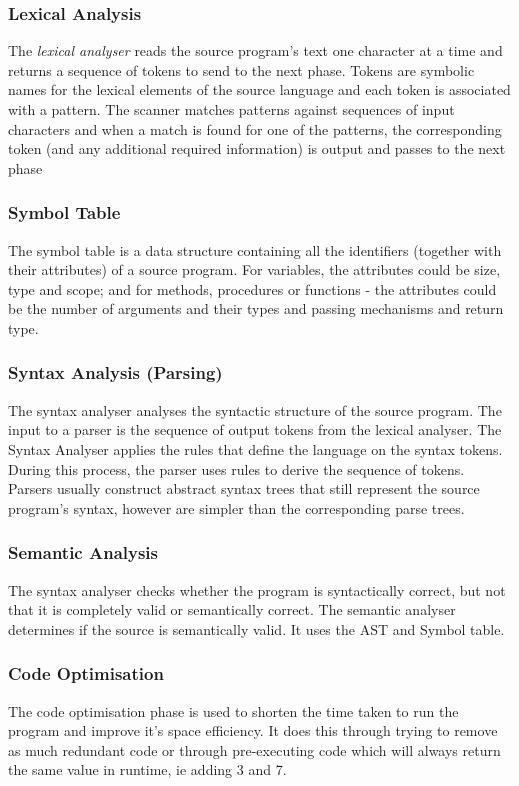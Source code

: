\subsubsection{Lexical Analysis}
The \textit{lexical analyser} reads the source program's text one character at a time and returns a sequence of tokens to send to the next phase. Tokens are symbolic names for the lexical elements of the source language and each token is associated with a pattern. The scanner matches patterns against sequences of input characters and when a match is found for one of the patterns, the corresponding token (and any additional required information) is output and passes to the next phase

\subsubsection{Symbol Table}
The symbol table is a data structure containing all the identifiers (together with their attributes) of a source program. For variables, the attributes could be size, type and scope; and for methods, procedures or functions - the attributes could be the number of arguments and their types and passing mechanisms and return type. 

\subsubsection{Syntax Analysis (Parsing)}
The syntax analyser analyses the syntactic structure of the source program. The input to a parser is the sequence of output tokens from the lexical analyser. The Syntax Analyser applies the rules that define the language on the syntax tokens. During this process, the parser uses rules to derive the sequence of tokens. Parsers usually construct abstract syntax trees that still represent the source program's syntax, however are simpler than the corresponding parse trees. 

\subsubsection{Semantic Analysis}
The syntax analyser checks whether the program is syntactically correct, but not that it is completely valid or semantically correct. The semantic analyser determines if the source is semantically valid. It uses the AST and Symbol table. 

\subsubsection{Code Optimisation}
The code optimisation phase is used to shorten the time taken to run the program and improve it's space efficiency. It does this through trying to remove as much redundant code or through pre-executing code which will always return the same value in runtime, ie adding 3 and 7.

